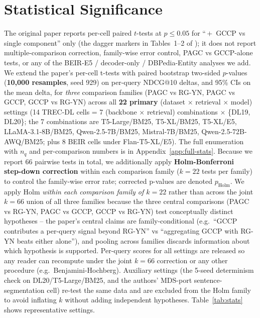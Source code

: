 \documentclass[sigconf]{acmart}
\begin{document}
\section{Statistical Significance}
\label{sec:stats}

The original paper reports per-cell paired $t$-tests at $p \leq 0.05$
for ``\,$+$~GCCP vs single component'' only (the dagger markers in
Tables~1--2 of \cite{long2025precise}); it does not report
multiple-comparison correction, family-wise error control, PAGC vs
GCCP-alone tests, or any of the BEIR-E5 / decoder-only / DBPedia-Entity
analyses we add. We extend the paper's per-cell t-tests with paired
bootstrap two-sided $p$-values (\textbf{10{,}000 resamples}, seed 929)
on per-query NDCG@10 deltas, and 95\% CIs on the mean delta, for
\emph{three} comparison families (PAGC vs RG-YN, PAGC vs GCCP, GCCP
vs RG-YN) across all
\textbf{22 primary} (dataset $\times$ retrieval $\times$ model) settings
(14 TREC-DL cells = 7 (backbone $\times$ retrieval) combinations
$\times$ \{DL19, DL20\}; the 7 combinations are T5-Large/BM25,
T5-XL/BM25, T5-XL/E5, LLaMA-3.1-8B/BM25, Qwen-2.5-7B/BM25,
Mistral-7B/BM25, Qwen-2.5-72B-AWQ/BM25; plus 8 BEIR cells under
Flan-T5-XL/E5).
The full enumeration with $n_q$ and per-comparison numbers is in
Appendix~\ref{app:full-stats}. Because we report 66 pairwise tests
in total, we additionally apply \textbf{Holm-Bonferroni~\cite{holm1979} step-down
correction} within each comparison family ($k{=}22$ tests per family)
to control the family-wise error rate; corrected p-values are denoted
$p_{\text{Holm}}$. We apply Holm \emph{within each comparison family
of $k=22$} rather than across the joint $k=66$ union of all three
families because the three central comparisons (PAGC vs RG-YN, PAGC
vs GCCP, GCCP vs RG-YN) test conceptually distinct hypotheses --
the paper's central claims are family-conditional (e.g.\ ``GCCP
contributes a per-query signal beyond RG-YN'' vs ``aggregating GCCP
with RG-YN beats either alone''), and pooling across families
discards information about which hypothesis is supported. Per-query
scores for all settings are released so any reader can recompute
under the joint $k=66$ correction or any other procedure (e.g.\
Benjamini-Hochberg).
Auxiliary settings (the 5-seed determinism check on DL20/T5-Large/BM25,
and the authors' MDS-port sentence-segmentation cell) re-test the same data and
are excluded from the Holm family to avoid inflating $k$ without adding
independent hypotheses. Table~\ref{tab:stats} shows representative settings.
\end{document}
